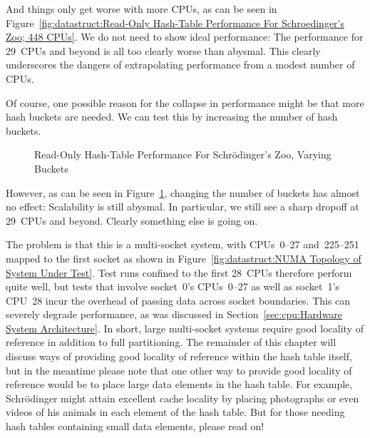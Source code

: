 And things only get worse with more CPUs, as can be seen in
Figure~\ref{fig:datastruct:Read-Only Hash-Table Performance For Schroedinger's Zoo; 448 CPUs}.
We do not need to show ideal performance: The performance for 29~CPUs
and beyond is all too clearly worse than abysmal.
This clearly underscores the dangers of extrapolating performance from a
modest number of CPUs.

Of course, one possible reason for the collapse in performance might be
that more hash buckets are needed.
We can test this by increasing the number of hash buckets.

\QuickQuizEnd


\begin{figure}
\centering
{}
\caption{Read-Only Hash-Table Performance For Schr\"odinger's Zoo, Varying Buckets}
\label{fig:datastruct:Read-Only Hash-Table Performance For Schroedinger's Zoo; Varying Buckets}
\end{figure}

However, as can be seen in
Figure~\ref{fig:datastruct:Read-Only Hash-Table Performance For Schroedinger's Zoo; Varying Buckets},
changing the number of buckets has almost no effect:
Scalability is still abysmal.
In particular, we still see a sharp dropoff at 29~CPUs and beyond.
Clearly something else is going on.

The problem is that this is a multi-socket system, with CPUs~0--27
and~225--251 mapped to the first socket as shown in
Figure~\ref{fig:datastruct:NUMA Topology of System Under Test}.
Test runs confined to the first 28~CPUs therefore perform quite
well, but tests that involve socket~0's CPUs~0--27 as well as
socket~1's CPU~28 incur the overhead of passing data across
socket boundaries.
This can severely degrade performance, as was discussed in
Section~\ref{sec:cpu:Hardware System Architecture}.
In short, large multi-socket systems require good locality of reference
in addition to full partitioning.
The remainder of this chapter will discuss ways of providing good
locality of reference within the hash table itself, but in the
meantime please note that one other way to provide good locality
of reference would be to place large data elements in the hash
table.
For example, Schr\"odinger might attain excellent cache locality by
placing photographs or even videos of his animals in each element of
the hash table.
But for those needing hash tables containing small data elements,
please read on!

